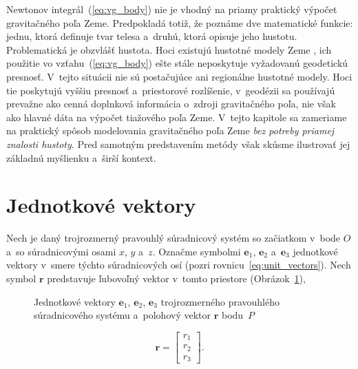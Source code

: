\documentclass[a4paper,12pt]{book}
\let\vec\mathbf
\begin{document}
Newtonov integrál~(\ref{eq:vg_body}) nie je vhodný na priamy praktický výpočet 
gravitačného poľa Zeme.  Predpokladá totiž, že poznáme dve matematické funkcie: 
jednu, ktorá definuje tvar telesa a~druhú, ktorá opisuje jeho hustotu.  
Problematická je obzvlášť hustota.  Hoci existujú hustotné modely Zeme 
\parencite[napríklad][]{Dziewonski1981}, ich použitie vo 
vzťahu~(\ref{eq:vg_body}) ešte stále neposkytuje vyžadovanú geodetickú 
presnosť.  V~tejto situácii nie sú postačujúce ani regionálne hustotné modely.  
Hoci tie poskytujú vyššiu presnosť a~priestorové rozlíšenie, v~geodézii sa 
používajú prevažne ako cenná doplnková informácia o~zdroji gravitačného poľa, 
nie však ako hlavné dáta na výpočet tiažového poľa Zeme.  V~tejto kapitole sa 
zameriame na praktický spôsob modelovania gravitačného poľa Zeme \emph{bez 
potreby priamej znalosti hustoty}.  Pred samotným predstavením metódy však 
skúsme ilustrovať jej základnú myšlienku a~širší kontext.






\section{Jednotkové vektory}
\label{sec:unit_vectors}

Nech je daný trojrozmerný pravouhlý súradnicový systém so začiatkom v~bode $O$
a~so súradnicovými osami $x$, $y$ a~$z$.  Označme symbolmi $\vec e_1$, $\vec
e_2$ a~$\vec e_3$ jednotkové vektory v~smere týchto súradnicových osí (pozri 
rovnicu~\ref{eq:unit_vectors}).  Nech symbol $\vec r$ predstavuje ľubovoľný 
vektor v~tomto priestore (Obrázok~\ref{fig:unit_vectors}),
\begin{figure}
\centering

\caption{Jednotkové vektory $\vec e_1$, $\vec e_2$, $\vec e_3$ trojrozmerného
pravouhlého súradnicového systému a~polohový vektor $\vec r$ bodu~$P$}
\label{fig:unit_vectors}
\end{figure}

\begin{equation}
\vec r =
\begin{bmatrix}
r_1\\
r_2\\
r_3
\end{bmatrix}
{.}
\end{equation}
\end{document}
